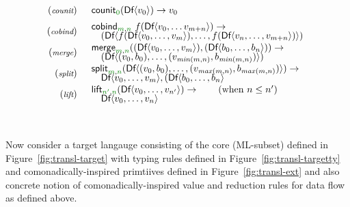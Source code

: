 \documentclass[
		twoside,openright,titlepage,numbers=noenddot,headinclude,%
                footinclude=true,cleardoublepage=empty,
                BCOR=10mm,paper=a4,fontsize=10pt, %
                ngerman,american, %
                ]{scrreprt}
\newcommand{\ident}[1]{\textnormal{\sffamily #1}}
\newcommand{\cclrd}[1]{\textcolor{cclr}{#1}}
\begin{document}
\begin{equation*}
\begin{array}{rl}
{\footnotesize(\emph{counit})} & \begin{array}{l}
\ident{counit}_{\cclrd{0}}(\ident{Df} \langle v_0 \rangle)   \rightarrow v_0
\end{array}
\\[0.5em]
{\footnotesize(\emph{cobind})} & \begin{array}{l}
\ident{cobind}_{\cclrd{m}, \cclrd{n}}~f (\ident{Df}\langle v_0, \ldots v_{m+n} \rangle) \rightarrow
\\[-0.25em]
\quad (\ident{Df}\langle f (\ident{Df}\langle v_0, \ldots, v_m \rangle), \ldots, f (\ident{Df}\langle v_{n}, \ldots, v_{m+n} \rangle) \rangle)
\end{array}
\\[0.5em]
{\footnotesize(\emph{merge})} & \begin{array}{l}
\ident{merge}_{\cclrd{m}, \cclrd{n}} ((\ident{Df}\langle v_0, \ldots, v_m \rangle), (\ident{Df}\langle b_0, \ldots, b_n\rangle)) \rightarrow
\\[-0.25em]
\quad (\ident{Df}\langle (v_0, b_0), \ldots, (v_{\mathit{min}(m,n)}, b_{\mathit{min}(m,n)}) \rangle)
\end{array}
\\[0.5em]
{\footnotesize(\emph{split})} & \begin{array}{l}
\ident{split}_{\cclrd{m}, \cclrd{n}} (\ident{Df}\langle (v_0, b_0), \ldots, (v_{\mathit{max}(m,n)}, b_{\mathit{max}(m,n)}) \rangle)  \rightarrow
\\[-0.25em]
\quad \ident{Df}\langle v_0, \ldots, v_m \rangle, (\ident{Df}\langle b_0, \ldots, b_n\rangle
\end{array}
\\[0.5em]
{\footnotesize(\emph{lift})} & \begin{array}{l}
\ident{lift}_{\cclrd{n'}, \cclrd{n}} (\ident{Df}\langle v_0, \ldots, v_{n'} \rangle) \rightarrow
\qquad(\textnormal{when}~n\leq n') \\[-0.25em]
\quad \ident{Df}\langle v_0, \ldots, v_n \rangle
\end{array}
\end{array}
\end{equation*}

~

\noindent
Now consider a target langauge consisting of the core (ML-subset) defined in Figure~\ref{fig:transl-target}
with typing rules defined in Figure~\ref{fig:transl-targetty} and comonadically-inspired primtiives
defined in Figure~\ref{fig:transl-ext} and also concrete notion of comonadically-inspired value
and reduction rules for data flow as defined above.
\end{document}
